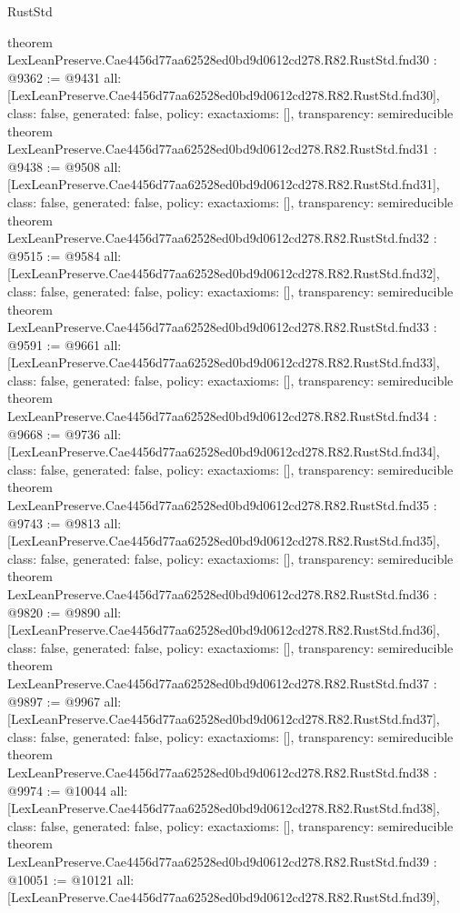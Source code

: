 \begin{lexlean}{RustStd}
\begin{coremodule}
{}
theorem LexLeanPreserve.Cae4456d77aa62528ed0bd9d0612cd278.R82.RustStd.fnd30 : @9362 := @9431 {
  all: [LexLeanPreserve.Cae4456d77aa62528ed0bd9d0612cd278.R82.RustStd.fnd30],
  class: false,
  generated: false,
  policy: exact{axioms: []},
  transparency: semireducible
}
theorem LexLeanPreserve.Cae4456d77aa62528ed0bd9d0612cd278.R82.RustStd.fnd31 : @9438 := @9508 {
  all: [LexLeanPreserve.Cae4456d77aa62528ed0bd9d0612cd278.R82.RustStd.fnd31],
  class: false,
  generated: false,
  policy: exact{axioms: []},
  transparency: semireducible
}
theorem LexLeanPreserve.Cae4456d77aa62528ed0bd9d0612cd278.R82.RustStd.fnd32 : @9515 := @9584 {
  all: [LexLeanPreserve.Cae4456d77aa62528ed0bd9d0612cd278.R82.RustStd.fnd32],
  class: false,
  generated: false,
  policy: exact{axioms: []},
  transparency: semireducible
}
theorem LexLeanPreserve.Cae4456d77aa62528ed0bd9d0612cd278.R82.RustStd.fnd33 : @9591 := @9661 {
  all: [LexLeanPreserve.Cae4456d77aa62528ed0bd9d0612cd278.R82.RustStd.fnd33],
  class: false,
  generated: false,
  policy: exact{axioms: []},
  transparency: semireducible
}
theorem LexLeanPreserve.Cae4456d77aa62528ed0bd9d0612cd278.R82.RustStd.fnd34 : @9668 := @9736 {
  all: [LexLeanPreserve.Cae4456d77aa62528ed0bd9d0612cd278.R82.RustStd.fnd34],
  class: false,
  generated: false,
  policy: exact{axioms: []},
  transparency: semireducible
}
theorem LexLeanPreserve.Cae4456d77aa62528ed0bd9d0612cd278.R82.RustStd.fnd35 : @9743 := @9813 {
  all: [LexLeanPreserve.Cae4456d77aa62528ed0bd9d0612cd278.R82.RustStd.fnd35],
  class: false,
  generated: false,
  policy: exact{axioms: []},
  transparency: semireducible
}
theorem LexLeanPreserve.Cae4456d77aa62528ed0bd9d0612cd278.R82.RustStd.fnd36 : @9820 := @9890 {
  all: [LexLeanPreserve.Cae4456d77aa62528ed0bd9d0612cd278.R82.RustStd.fnd36],
  class: false,
  generated: false,
  policy: exact{axioms: []},
  transparency: semireducible
}
theorem LexLeanPreserve.Cae4456d77aa62528ed0bd9d0612cd278.R82.RustStd.fnd37 : @9897 := @9967 {
  all: [LexLeanPreserve.Cae4456d77aa62528ed0bd9d0612cd278.R82.RustStd.fnd37],
  class: false,
  generated: false,
  policy: exact{axioms: []},
  transparency: semireducible
}
theorem LexLeanPreserve.Cae4456d77aa62528ed0bd9d0612cd278.R82.RustStd.fnd38 : @9974 := @10044 {
  all: [LexLeanPreserve.Cae4456d77aa62528ed0bd9d0612cd278.R82.RustStd.fnd38],
  class: false,
  generated: false,
  policy: exact{axioms: []},
  transparency: semireducible
}
theorem LexLeanPreserve.Cae4456d77aa62528ed0bd9d0612cd278.R82.RustStd.fnd39 : @10051 := @10121 {
  all: [LexLeanPreserve.Cae4456d77aa62528ed0bd9d0612cd278.R82.RustStd.fnd39],
}
\end{coremodule}
\end{lexlean}
